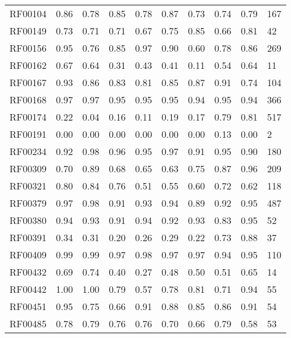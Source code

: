 \begin{tabular}{lrrrrrrrrl}
RF00104      &  0.86 &  0.78 &  0.85 &   0.78 &    0.87 &     0.73 &  0.74 & 0.79 &        167 \\
RF00149      &  0.73 &  0.71 &  0.71 &   0.67 &    0.75 &     0.85 &  0.66 & 0.81 &         42 \\
RF00156      &  0.95 &  0.76 &  0.85 &   0.97 &    0.90 &     0.60 &  0.78 & 0.86 &        269 \\
RF00162      &  0.67 &  0.64 &  0.31 &   0.43 &    0.41 &     0.11 &  0.54 & 0.64 &         11 \\
RF00167      &  0.93 &  0.86 &  0.83 &   0.81 &    0.85 &     0.87 &  0.91 & 0.74 &        104 \\
RF00168      &  0.97 &  0.97 &  0.95 &   0.95 &    0.95 &     0.94 &  0.95 & 0.94 &        366 \\
RF00174      &  0.22 &  0.04 &  0.16 &   0.11 &    0.19 &     0.17 &  0.79 & 0.81 &        517 \\
RF00191      &  0.00 &  0.00 &  0.00 &   0.00 &    0.00 &     0.00 &  0.13 & 0.00 &          2 \\
RF00234      &  0.92 &  0.98 &  0.96 &   0.95 &    0.97 &     0.91 &  0.95 & 0.90 &        180 \\
RF00309      &  0.70 &  0.89 &  0.68 &   0.65 &    0.63 &     0.75 &  0.87 & 0.96 &        209 \\
RF00321      &  0.80 &  0.84 &  0.76 &   0.51 &    0.55 &     0.60 &  0.72 & 0.62 &        118 \\
RF00379      &  0.97 &  0.98 &  0.91 &   0.93 &    0.94 &     0.89 &  0.92 & 0.95 &        487 \\
RF00380      &  0.94 &  0.93 &  0.91 &   0.94 &    0.92 &     0.93 &  0.83 & 0.95 &         52 \\
RF00391      &  0.34 &  0.31 &  0.20 &   0.26 &    0.29 &     0.22 &  0.73 & 0.88 &         37 \\
RF00409      &  0.99 &  0.99 &  0.97 &   0.98 &    0.97 &     0.97 &  0.94 & 0.95 &        110 \\
RF00432      &  0.69 &  0.74 &  0.40 &   0.27 &    0.48 &     0.50 &  0.51 & 0.65 &         14 \\
RF00442      &  1.00 &  1.00 &  0.79 &   0.57 &    0.78 &     0.81 &  0.71 & 0.94 &         55 \\
RF00451      &  0.95 &  0.75 &  0.66 &   0.91 &    0.88 &     0.85 &  0.86 & 0.91 &         54 \\
RF00485      &  0.78 &  0.79 &  0.76 &   0.76 &    0.70 &     0.66 &  0.79 & 0.58 &         53 \\

\end{tabular}

